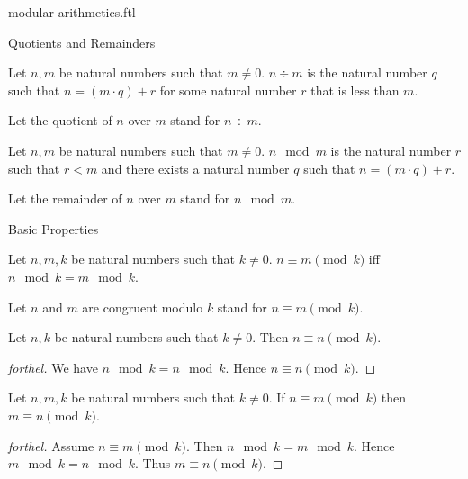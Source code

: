 \documentclass{naproche-library}
\begin{document}
\begin{smodule}[title=Modular Arithmetics]{modular-arithmetics.ftl}

\begin{sfragment}{Quotients and Remainders}
  \begin{definition}[forthel,id=ARITHMETIC_08_8621463798022144]
    Let $n, m$ be natural numbers such that $m \neq 0$.
    $n \div m$ is the natural number $q$ such that $n = (m \cdot q) + r$ for some natural number $r$ that is less than $m$.

    Let the quotient of $n$ over $m$ stand for $n \div m$.
  \end{definition}

  \begin{definition}[forthel,id=ARITHMETIC_08_3560980160184320]
    Let $n, m$ be natural numbers such that $m \neq 0$.
    $n \mod m$ is the natural number $r$ such that $r < m$ and there exists a natural number $q$ such that $n = (m \cdot q) + r$.

    Let the remainder of $n$ over $m$ stand for $n \mod m$.
  \end{definition}
\end{sfragment}

\begin{sfragment}{Basic Properties}
  \begin{definition}[forthel,id=ARITHMETIC_08_5448561831444480]
    Let $n, m, k$ be natural numbers such that $k \neq 0$.
    $n \equiv m \pmod{k}$ iff $n \mod k = m \mod k$.

    Let $n$ and $m$ are congruent modulo $k$ stand for $n \equiv m \pmod{k}$.
  \end{definition}

  \begin{proposition}[forthel,id=ARITHMETIC_08_3818318544764928]
    Let $n, k$ be natural numbers such that $k \neq 0$.
    Then $n \equiv n \pmod{k}$.
  \end{proposition}
  \begin{proof}[forthel]
    We have $n \mod k = n \mod k$.
    Hence $n \equiv n \pmod{k}$.
  \end{proof}

  \begin{proposition}[forthel,id=ARITHMETIC_08_2337210737098752]
    Let $n, m, k$ be natural numbers such that $k \neq 0$.
    If $n \equiv m \pmod{k}$ then $m \equiv n \pmod{k}$.
  \end{proposition}
  \begin{proof}[forthel]
    Assume $n \equiv m \pmod{k}$.
    Then $n \mod k = m \mod k$.
    Hence $m \mod k = n \mod k$.
    Thus $m \equiv n \pmod{k}$.
  \end{proof}


\end{sfragment}
\end{smodule}
\end{document}
